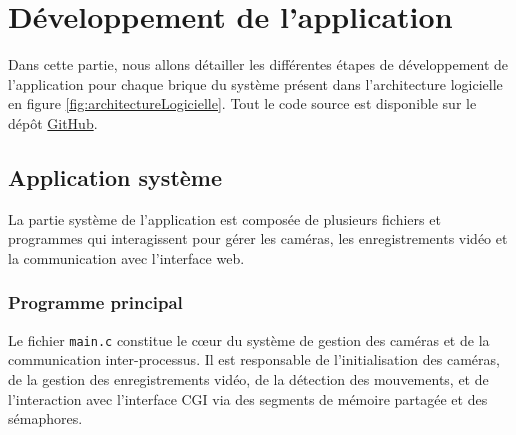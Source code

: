 \documentclass[a4paper, 11pt, french]{article}
\begin{document}

\section{Développement de l'application}
Dans cette partie, nous allons détailler les différentes étapes de développement de l'application pour chaque brique du système présent dans l'architecture logicielle en figure \ref{fig:architectureLogicielle}. Tout le code source est disponible sur le dépôt \href{https://github.com/Romaiiin91/suiviGrimpeur_PDI}{GitHub}.

\subsection{Application système}

La partie système de l'application est composée de plusieurs fichiers et programmes qui interagissent pour gérer les caméras, les enregistrements vidéo et la communication avec l'interface web. 

\subsubsection{Programme principal}

Le fichier \texttt{main.c} constitue le cœur du système de gestion des caméras et de la communication inter-processus. Il est responsable de l'initialisation des caméras, de la gestion des enregistrements vidéo, de la détection des mouvements, et de l'interaction avec l'interface CGI via des segments de mémoire partagée et des sémaphores.
\end{document}
